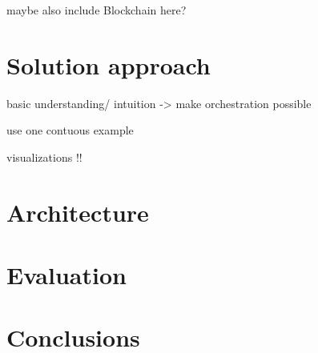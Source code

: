 \documentclass[runningheads]{llncs}
\begin{document}
maybe also include Blockchain here? 

\section{Solution approach}

basic understanding/ intuition
-> make orchestration possible

use one contuous example

visualizations !!

\section{Architecture}

\section{Evaluation}

\section{Conclusions}

%
%
%


\end{document}
